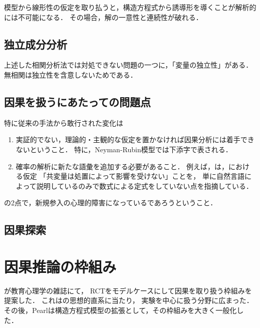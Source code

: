 \documentclass[uplatex,dvipdfmx]{jsreport}
\begin{document}
\begin{problem}[非線形性の扱い]
    模型から線形性の仮定を取り払うと，構造方程式から誘導形を導くことが解析的には不可能になる．
    その場合，解の一意性と連続性が破れる．
\end{problem}

\subsection{独立成分分析}

\begin{tcolorbox}[colframe=ForestGreen, colback=ForestGreen!10!white,breakable,colbacktitle=ForestGreen!40!white,coltitle=black,fonttitle=\bfseries\sffamily,
title=]
    上述した相関分析法では対処できない問題の一つに，「変量の独立性」がある\cite{統計科学のフロンティア5}．
    無相関は独立性を含意しないためである．
\end{tcolorbox}

\subsection{因果を扱うにあたっての問題点}

\begin{remark}
    特に従来の手法から敢行された変化は
    \begin{enumerate}
        \item 実証的でない，理論的・主観的な仮定を置かなければ因果分析には着手できないということ．
        特に，Neyman-Rubin模型では下添字で表される．
        \item 確率の解析に新たな語彙を追加する必要があること．
        例えば，\cite{Pearl-Overview09}は，\cite{Cox58-Planning}における仮定
        「共変量は処置によって影響を受けない」ことを，
        単に自然言語によって説明しているのみで数式による定式をしていない点を指摘している．
    \end{enumerate}
    の2点で，新規参入の心理的障害になっているであろうということ．
\end{remark}

\subsection{因果探索}

\section{因果推論の枠組み}

\begin{history}
    \cite{Rubin74-Causal}が教育心理学の雑誌にて，
    RCTをモデルケースにして因果を取り扱う枠組みを提案した．
    これは\cite{Neyman-23}の思想的直系に当たり，
    実験を中心に扱う分野に広まった．
    その後，Pearlは構造方程式模型の拡張として，その枠組みを大きく一般化した．
\end{history}
\end{document}
